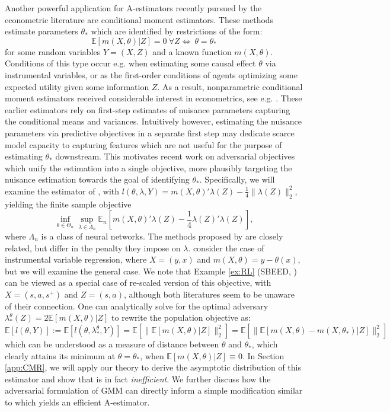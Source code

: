 \documentclass[12pt]{article}
\theoremstyle{myplain}
\theoremstyle{definition}
\theoremstyle{definition}
\theoremstyle{remark}
\numberwithin{equation}{section}
\begin{document}
Another powerful application for A-estimators recently pursued by the econometric literature are conditional moment estimators. These methods estimate parameters $\theta_*$ which are identified by restrictions of the form:
\begin{equation}\label{eq:cmr}
    \mathbb{E}[m(X, \theta)|Z]=0 \ \forall Z \iff \ \theta=\theta_*
\end{equation}
for some random variables $Y=(X,Z)$ and a known function $m(X,\theta)$. Conditions of this type occur e.g. when estimating some causal effect $\theta$ via instrumental variables, or as the first-order conditions of agents optimizing some expected utility given some information $Z$. As a result, nonparametric conditional moment estimators received considerable interest in econometrics, see e.g. \cite{aichen2003, aichen2007, chenqiu2016}. These earlier estimators rely on first-step estimates of nuisance parameters capturing the conditional means and variances. Intuitively however, estimating the nuisance parameters via predictive objectives in a separate first step may dedicate scarce model capacity to capturing features which are not useful for the purpose of estimating $\theta_*$ downstream. This motivates recent work on adversarial objectives which unify the estimation into a single objective, more plausibly targeting the nuisance estimation towards the goal of identifying $\theta_*$. Specifically, we will examine the estimator of \cite{dikkala2020minimax}, with $l(\theta,\lambda,Y)=m(X, \theta)'\lambda(Z)-\frac{1}{4}\|\lambda(Z)\|_2^2$, yielding the finite sample objective
$$\inf_{\theta\in\Theta_n}\sup_{\lambda\in\Lambda_n}  \mathbb{E}_n\left[ m(X,\theta)'\lambda(Z) -  \frac{1}{4} \lambda(Z)'\lambda(Z) \right],$$
where $\Lambda_n$ is a class of neural networks. The methods proposed by \cite{Bennett2019DeepGM, variationalMM2020} are closely related, but differ in the penalty they impose on $\lambda$. \cite{dikkala2020minimax} consider the case of instrumental variable regression, where $X=(y,x)$ and $m(X,\theta)=y-\theta(x)$, but we will examine the general case. We note that Example \ref{ex:RL} (SBEED, \cite{sbeed}) can be viewed as a special case of re-scaled version of this objective, with $X=(s,a, s^+)$ and $Z=(s,a)$, although both literatures seem to be unaware of their connection. One can analytically solve for the optimal adversary $\lambda_*^\theta(Z)=2\mathbb{E}[m(X,\theta)|Z]$ to rewrite the population objective as:
$$\mathbb{E}[l(\theta,Y)]:=\mathbb{E}[l(\theta, \lambda_*^\theta,Y)] =\mathbb{E}[\|\mathbb{E}[m(X,\theta)|Z]\|_2^2]=\mathbb{E}[\|\mathbb{E}[m(X,\theta)-m(X,\theta_*)|Z]\|_2^2]$$
which can be understood as a measure of distance between $\theta$ and $\theta_*$, which clearly attains its minimum at $\theta=\theta_*$, when $\mathbb{E}[m(X,\theta)|Z]\equiv0$. In Section \ref{app:CMR}, we will apply our theory to derive the asymptotic distribution of this estimator and show that is in fact {\it inefficient}. We further discuss how the adversarial formulation of GMM can directly inform a simple modification similar to \cite{variationalMM2020} which yields an efficient A-estimator.
\end{document}
